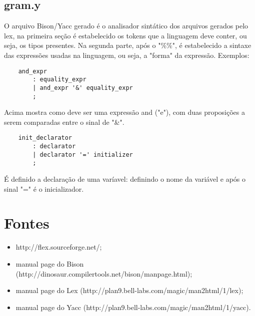 \documentclass{article}
\begin{document}
\subsection*{gram.y}
    O arquivo Bison/Yacc gerado é o analisador sintático dos arquivos gerados pelo lex, na primeira seção é estabelecido os tokens que a linguagem deve conter, ou seja, os tipos presentes. Na segunda parte, após o "\%\%", é estabelecido a sintaxe das expressões usadas na linguagem, ou seja, a "forma" da expressão. Exemplos:
\begin{verbatim}
    and_expr
        : equality_expr
        | and_expr '&' equality_expr
        ;
\end{verbatim}
    Acima mostra como deve ser uma expressão and ("e"), com duas proposições a serem comparadas entre o sinal de "\&".
\begin{verbatim}
    init_declarator
        : declarator
        | declarator '=' initializer
        ;
\end{verbatim}
    É definido a declaração de uma varíavel: definindo o nome da variável e após o sinal "=" é o inicializador.
    
\section*{Fontes}
\begin{itemize}
    \item http://flex.sourceforge.net/;
    \item manual page do Bison (http://dinosaur.compilertools.net/bison/manpage.html);
    \item manual page do Lex (http://plan9.bell-labs.com/magic/man2html/1/lex);
    \item manual page do Yacc (http://plan9.bell-labs.com/magic/man2html/1/yacc).
\end{itemize}
\end{document}
